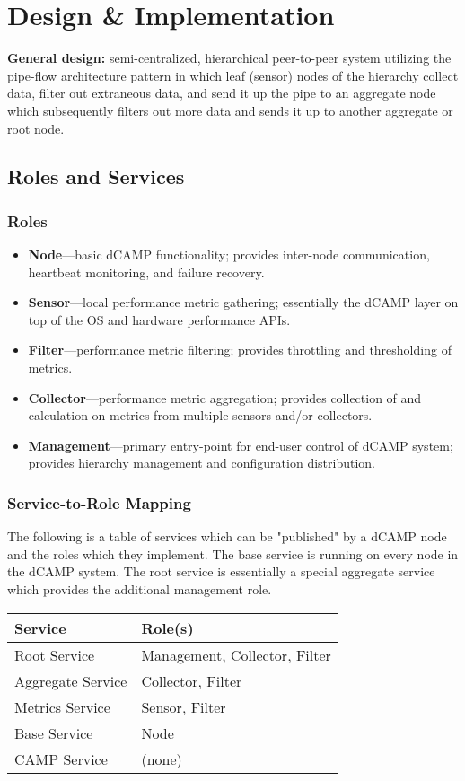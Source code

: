 \chapter{Design \& Implementation}
\label{design_implementation}

\textbf{General design:} semi-centralized, hierarchical peer-to-peer system utilizing the pipe-flow architecture pattern in which leaf (sensor) nodes of the hierarchy collect data, filter out extraneous data, and send it up the pipe to an aggregate node which subsequently filters out more data and sends it up to another aggregate or root node.

\section{\dcamp Roles and Services}
\subsection{Roles}
\begin{itemize}
\item \textbf{Node}---basic dCAMP functionality; provides inter-node communication, heartbeat monitoring, and failure recovery. 
\item \textbf{Sensor}---local performance metric gathering; essentially the dCAMP layer on top of the OS and hardware performance APIs. 
\item \textbf{Filter}---performance metric filtering; provides throttling and thresholding of metrics. 
\item \textbf{Collector}---performance metric aggregation; provides collection of and calculation on metrics from multiple sensors and/or collectors. 
\item \textbf{Management}---primary entry-point for end-user control of dCAMP system; provides hierarchy management and configuration distribution.
\end{itemize}

\subsection{Service-to-Role Mapping}
The following is a table of services which can be "published" by a dCAMP node and the roles which they implement. The base service is running on every node in the dCAMP system. The root service is essentially a special aggregate service which provides the additional management role. 
\begin{tabular}{|l|l|}
\hline
\textbf{Service} & \textbf{Role(s)} \\
\hline
Root Service & Management, Collector, Filter \\
\hline
Aggregate Service & Collector, Filter \\
\hline
Metrics Service & Sensor, Filter \\
\hline
Base Service & Node \\
\hline
CAMP Service & (none) \\
\hline
\end{tabular}

